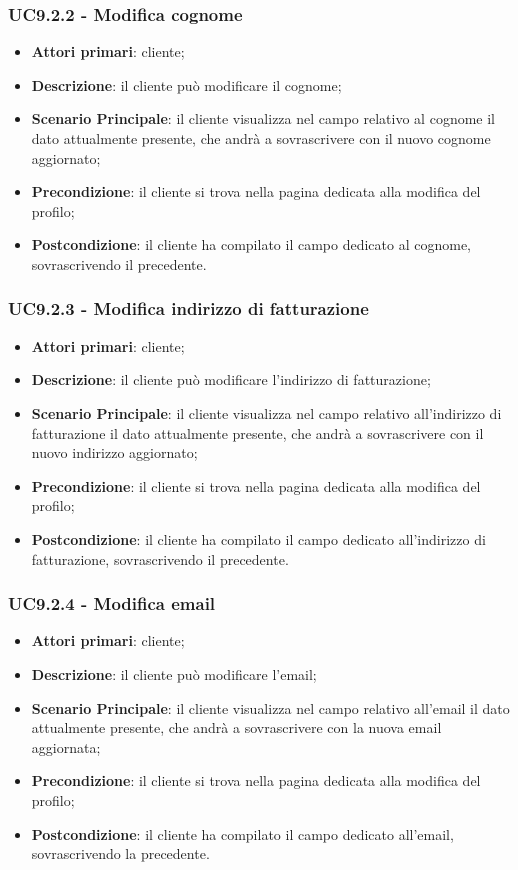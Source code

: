 \subsubsection{UC9.2.2 - Modifica cognome}
\begin{itemize}
\item \textbf{Attori primari}: cliente;
\item \textbf{Descrizione}: il cliente può modificare il cognome;
\item \textbf{Scenario Principale}: il cliente visualizza nel campo relativo al cognome il dato attualmente presente, che andrà a sovrascrivere con il nuovo cognome aggiornato;
\item \textbf{Precondizione}: il cliente si trova nella pagina dedicata alla modifica del profilo;
\item \textbf{Postcondizione}: il cliente ha compilato il campo dedicato al cognome, sovrascrivendo il precedente.
\end{itemize}

\subsubsection{UC9.2.3 - Modifica indirizzo di fatturazione}
\begin{itemize}
\item \textbf{Attori primari}: cliente;
\item \textbf{Descrizione}: il cliente può modificare l'indirizzo di fatturazione;
\item \textbf{Scenario Principale}: il cliente visualizza nel campo relativo all'indirizzo di fatturazione il dato attualmente presente, che andrà a sovrascrivere con il nuovo indirizzo aggiornato;
\item \textbf{Precondizione}: il cliente si trova nella pagina dedicata alla modifica del profilo;
\item \textbf{Postcondizione}: il cliente ha compilato il campo dedicato all'indirizzo di fatturazione, sovrascrivendo il precedente.
\end{itemize}

\subsubsection{UC9.2.4 - Modifica email}
\begin{itemize}
\item \textbf{Attori primari}: cliente;
\item \textbf{Descrizione}: il cliente può modificare l'email;
\item \textbf{Scenario Principale}: il cliente visualizza nel campo relativo all'email il dato attualmente presente, che andrà a sovrascrivere con la nuova email aggiornata;
\item \textbf{Precondizione}: il cliente si trova nella pagina dedicata alla modifica del profilo;
\item \textbf{Postcondizione}: il cliente ha compilato il campo dedicato all'email, sovrascrivendo la precedente.
\end{itemize}


